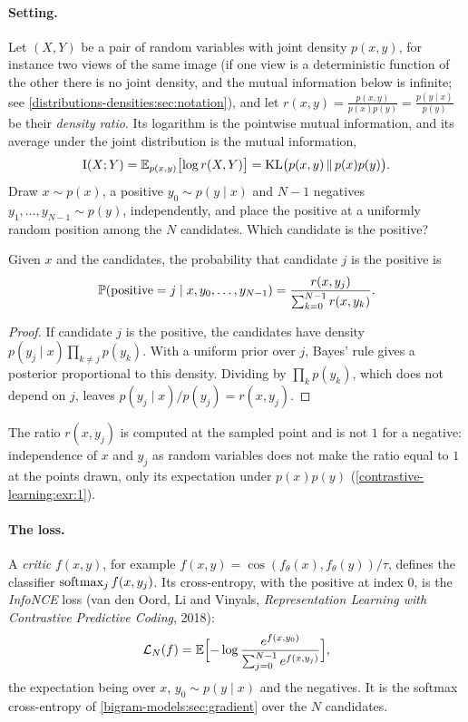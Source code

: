 \begin{notechapter}
\paragraph{Setting.} Let $(X, Y)$ be a pair of random variables with joint density $p(x, y)$, for instance two views of
the same image (if one view is a deterministic function of the other there is no joint density, and the
mutual information below is infinite; see \cref{distributions-densities:sec:notation}), and let $r(x, y) = \frac{p(x, y)}{p(x)p(y)} = \frac{p(y\mid x)}{p(y)}$ be their \emph{density ratio}. Its logarithm is the pointwise
mutual information, and its average under the joint distribution is the mutual information,
\[
  \mathrm I(X; Y) = \mathbb{E}_{p(x,y)}\bigl[\log r(X, Y)\bigr] = \mathrm{KL}\bigl(p(x, y)\,\Vert\,p(x)p(y)\bigr) .
\]
Draw $x\sim p(x)$, a positive $y_0\sim p(y\mid x)$ and $N - 1$ negatives $y_1,\dots,y_{N-1}\sim p(y)$, independently, and place the positive at a
uniformly random position among the $N$ candidates. Which candidate is the positive?

\begin{proposition}\label{contrastive-learning:prop:bayes}
Given $x$ and the candidates, the probability that candidate $j$ is the positive is
\[
  \mathbb{P}(\text{positive} = j\mid x, y_0,\dots,y_{N-1}) = \frac{r(x, y_j)}{\sum_{k=0}^{N-1}r(x, y_k)} .
\]
\end{proposition}

\begin{proof}
If candidate $j$ is the positive, the candidates have density $p(y_j\mid x)\prod_{k\neq j}p(y_k)$. With a uniform prior over $j$,
Bayes' rule gives a posterior proportional to this density. Dividing by $\prod_kp(y_k)$, which does not depend on $j$,
leaves $p(y_j\mid x)/p(y_j) = r(x, y_j)$.
\end{proof}

The ratio $r(x, y_j)$ is computed at the sampled point and is not $1$ for a negative: independence of $x$ and $y_j$ as
random variables does not make the ratio equal to $1$ at the points drawn, only its expectation under
$p(x)p(y)$ (\cref{contrastive-learning:exr:1}).

\paragraph{The loss.} A \emph{critic} $f(x, y)$, for example $f(x, y) = \cos(f_\theta(x), f_\theta(y))/\tau$, defines the classifier $\operatorname{softmax}_j f(x, y_j)$. Its
cross-entropy, with the positive at index $0$, is the \emph{InfoNCE} loss (van den Oord, Li and Vinyals,
\emph{Representation Learning with Contrastive Predictive Coding}, 2018):
\[
  \mathcal L_N(f) = \mathbb{E}\Bigl[-\log\frac{e^{f(x, y_0)}}{\sum_{j=0}^{N-1}e^{f(x, y_j)}}\Bigr],
\]
the expectation being over $x$, $y_0\sim p(y\mid x)$ and the negatives. It is the softmax cross-entropy of
\cref{bigram-models:sec:gradient} over the $N$ candidates.


\end{notechapter}
